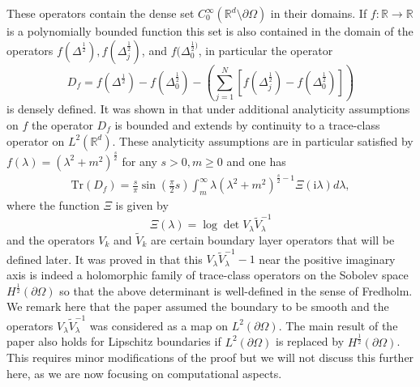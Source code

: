 These operators contain the dense set $C^\infty_0(\mathbb{R}^d \setminus \partial \Omega)$ in their domains.
If $f: \mathbb{R} \to \mathbb{R}$ is a polynomially bounded function this set is also contained in the domain of the operators
$f(\Delta^{\frac{1}{2}}), f(\Delta_{j}^{\frac{1}{2}})$, and $f(\Delta_{0}^{\frac{1}{2})}$, in particular the operator
$$
 D_{f} = f(\Delta^{\frac{1}{2}}) - f(\Delta_{0}^{\frac{1}{2}}) - \left(\sum_{j = 1}^{N}[f(\Delta_{j}^{\frac{1}{2}}) - f(\Delta_{0}^{\frac{1}{2}})]\right)
$$
is densely defined. It was shown in \cite{hanisch2020relative} that under additional analyticity assumptions on $f$ the operator
$D_{f}$ is bounded and extends by continuity to a trace-class operator on $L^2(\mathbb{R}^{d})$. 
These analyticity assumptions are in particular satisfied by $f(\lambda) = (\lambda^{2}+ m^{2})^{\frac{s}{2}}$ for any $s > 0, m \geq 0$ and one has
\begin{align}\label{trace formula in terms of the boundary op}
    \text{Tr}\left( D_{f} \right)  = \frac{s}{\pi} \sin\left(\frac{\pi}{2} s\right) \int_{m}^{\infty} \lambda (\lambda^{2} + m^{2})^{\frac{s}{2}-1}\Xi(\mathrm{i} \lambda) d \lambda,
\end{align}
where the function $\Xi$ is given by
$$
 \Xi(\lambda) = \log \det V_{\lambda} \tilde V_{\lambda}^{-1}
$$
and the operators $V_{k}$ and $\tilde V_{k}$ are certain boundary layer operators that will be defined later. 
It was proved in  \cite{hanisch2020relative} that this $V_{\lambda} \tilde V_{\lambda}^{-1}-1$ near the positive imaginary axis is indeed a holomorphic family of trace-class operators on the Sobolev space $H^\frac{1}{2}(\partial \Omega)$  so that the above determinant is well-defined in the sense of Fredholm. We remark here that the paper \cite{hanisch2020relative} assumed the boundary to be smooth and the operators $V_\lambda  \tilde V_\lambda^{-1}$ was considered as a map on $L^2(\partial \Omega)$. The main result of the paper also holds for Lipschitz boundaries if $L^2(\partial \Omega)$ is replaced by $H^\frac{1}{2}(\partial \Omega)$. This requires minor modifications of the proof but we will not discuss this further here, as we are now focusing on computational aspects.


